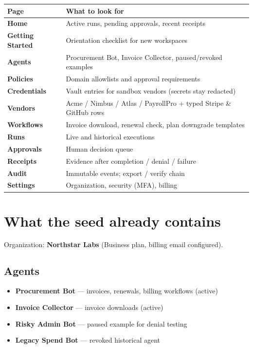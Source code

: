 \documentclass[11pt,a4paper]{article}
\newcommand{\DemoOrgName}{Northstar Labs}
\newcommand{\ui}[1]{\textbf{#1}}
\begin{document}
\begin{tabularx}{\textwidth}{@{}l X@{}}
  \toprule
  \textbf{Page} & \textbf{What to look for} \\
  \midrule
  \ui{Home} & Active runs, pending approvals, recent receipts \\
  \ui{Getting Started} & Orientation checklist for new workspaces \\
  \ui{Agents} & Procurement Bot, Invoice Collector, paused/revoked examples \\
  \ui{Policies} & Domain allowlists and approval requirements \\
  \ui{Credentials} & Vault entries for sandbox vendors (secrets stay redacted) \\
  \ui{Vendors} & Acme / Nimbus / Atlas / PayrollPro + typed Stripe \& GitHub rows \\
  \ui{Workflows} & Invoice download, renewal check, plan downgrade templates \\
  \ui{Runs} & Live and historical executions \\
  \ui{Approvals} & Human decision queue \\
  \ui{Receipts} & Evidence after completion / denial / failure \\
  \ui{Audit} & Immutable events; export / verify chain \\
  \ui{Settings} & Organization, security (MFA), billing \\
  \bottomrule
\end{tabularx}

\section{What the seed already contains}

Organization: \textbf{\DemoOrgName} (Business plan, billing email configured).

\subsection{Agents}
\begin{itemize}[leftmargin=1.2em]
  \item \textbf{Procurement Bot} --- invoices, renewals, billing workflows (active)
  \item \textbf{Invoice Collector} --- invoice downloads (active)
  \item \textbf{Risky Admin Bot} --- paused example for denial testing
  \item \textbf{Legacy Spend Bot} --- revoked historical agent
\end{itemize}
\end{document}

